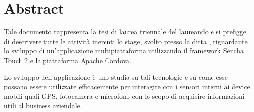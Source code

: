 \begingroup
\let\clearpage\relax
\let\cleardoublepage\relax
\let\cleardoublepage\relax

\chapter*{Abstract}
Tale documento rappresenta la tesi di laurea triennale del laureando \myName e si prefigge di descrivere tutte le attività inerenti lo stage, svolto presso la ditta \myCompany , riguardante lo sviluppo di un'applicazione multipiattaforma utilizzando il framework Sencha Touch 2 e la piattaforma Apache Cordova.

Lo sviluppo dell'applicazione è uno studio su tali tecnologie e su come esse possano essere utilizzate efficacemente per interagire con i sensori interni ai device mobili quali GPS, fotocamera e microfono con lo scopo di acquisire informazioni utili al business aziendale.



\endgroup			

\vfill